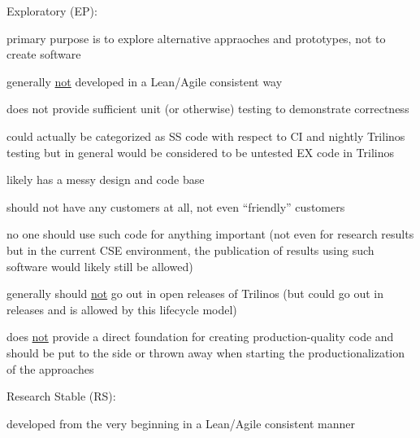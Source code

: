 \documentclass[11pt]{SANDreport}
\begin{document}
\begin{compactenum}

{}\item Exploratory (EP):

\begin{compactitem}

{}\item primary purpose is to explore alternative appraoches and
prototypes, not to create software

{}\item generally {}\underline{not} developed in a Lean/Agile
consistent way

{}\item does not provide sufficient unit (or otherwise) testing to
demonstrate correctness

{}\item could actually be categorized as SS code with respect to CI
and nightly Trilinos testing but in general would be considered to be
untested EX code in Trilinos

{}\item likely has a messy design and code base

{}\item should not have any customers at all, not even ``friendly''
customers

{}\item no one should use such code for anything important (not even
for research results but in the current CSE environment, the
publication of results using such software would likely still be
allowed)

{}\item generally should {}\underline{not} go out in open releases of
Trilinos (but could go out in releases and is allowed by this
lifecycle model)

{}\item does {}\underline{not} provide a direct foundation for
creating production-quality code and should be put to the side or
thrown away when starting the productionalization of the approaches

\end{compactitem}

{}\item Research Stable (RS):

\begin{compactitem}

{}\item developed from the very beginning in a Lean/Agile consistent
manner


\end{compactitem}
\end{compactenum}
\end{document}
